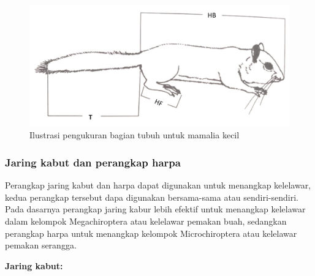 \documentclass[
]{book}
\begin{document}
\begin{figure}

{\centering \includegraphics[width=1\linewidth]{images/mfm_ilustration} 

}

\caption{Ilustrasi pengukuran bagian tubuh untuk mamalia kecil}\label{fig:mfsm}
\end{figure}

\hypertarget{jaring-kabut-dan-perangkap-harpa}{%
\subsubsection*{Jaring kabut dan perangkap harpa}\label{jaring-kabut-dan-perangkap-harpa}}

Perangkap jaring kabut dan harpa dapat digunakan untuk menangkap kelelawar, kedua perangkap tersebut dapa digunakan bersama-sama atau sendiri-sendiri. Pada dasarnya perangkap jaring kabur lebih efektif untuk menangkap kelelawar dalam kelompok Megachiroptera atau kelelawar pemakan buah, sedangkan perangkap harpa untuk menangkap kelompok Microchiroptera atau kelelawar pemakan serangga.

\textbf{Jaring kabut:}
\end{document}
